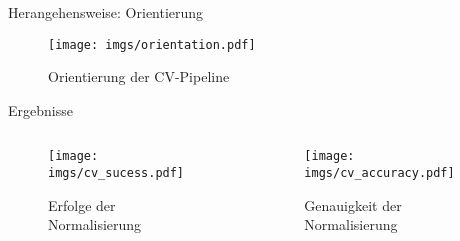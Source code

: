 \begin{frame}{Herangehensweise: Orientierung}
    \begin{figure}
        \centering
        \texttt{[image: imgs/orientation.pdf]}
        \caption{Orientierung der CV-Pipeline}
    \end{figure}
\end{frame}

\begin{frame}{Ergebnisse}
    \begin{columns}
        \begin{column}{0.5\linewidth}

            \begin{figure}
                \centering
                \texttt{[image: imgs/cv\_sucess.pdf]}
                \caption{Erfolge der Normalisierung}
            \end{figure}

        \end{column}
        \begin{column}{0.5\linewidth}

            \begin{figure}
                \centering
                \texttt{[image: imgs/cv\_accuracy.pdf]}
                \caption{Genauigkeit der Normalisierung}
            \end{figure}

        \end{column}
    \end{columns}
\end{frame}
